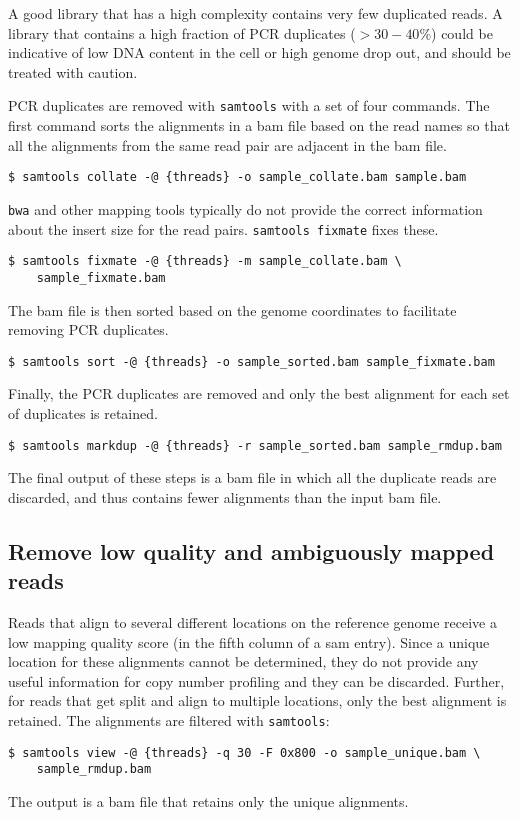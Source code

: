 \documentclass[11pt]{article}
\newcommand{\prog}[1]{\texttt{#1}}
\begin{document}
A good library that has a high complexity contains very few duplicated
reads. A library that contains a high fraction of PCR duplicates ($>30-40\%$)
could be indicative of low DNA content in the cell or high genome drop out,
and should be treated with caution.

PCR duplicates are removed with \prog{samtools} with a set of four
commands. The first command sorts the alignments in a bam file based on
the read names so that all the alignments from the same read pair are
adjacent in the bam file.
\begin{verbatim}
$ samtools collate -@ {threads} -o sample_collate.bam sample.bam
\end{verbatim}
%
\prog{bwa} and other mapping tools typically do not provide the correct
information about the insert size for the read pairs. \prog{samtools
fixmate} fixes these.
\begin{verbatim}
$ samtools fixmate -@ {threads} -m sample_collate.bam \
    sample_fixmate.bam
\end{verbatim}
%
The bam file is then sorted based on the genome coordinates to
facilitate removing PCR duplicates.
\begin{verbatim}
$ samtools sort -@ {threads} -o sample_sorted.bam sample_fixmate.bam
\end{verbatim}
%
Finally, the PCR duplicates are removed and only the best alignment for
each set of duplicates is retained.
\begin{verbatim}
$ samtools markdup -@ {threads} -r sample_sorted.bam sample_rmdup.bam
\end{verbatim}

The final output of these steps is a bam file in which all the duplicate
reads are discarded, and thus contains fewer alignments than the input bam
file.


\subsection{Remove low quality and ambiguously mapped reads}
Reads that align to several different locations on the reference
genome receive a low mapping quality score (in the fifth column of a
sam entry). Since a unique location for these alignments cannot be
determined, they do not provide any useful information for copy number
profiling and they can be discarded. Further, for reads that get split
and align to multiple locations, only the best alignment is retained. The
alignments are filtered with \prog{samtools}:
\begin{verbatim}
$ samtools view -@ {threads} -q 30 -F 0x800 -o sample_unique.bam \
    sample_rmdup.bam
\end{verbatim}
The output is a bam file that retains only the unique alignments.
\end{document}
